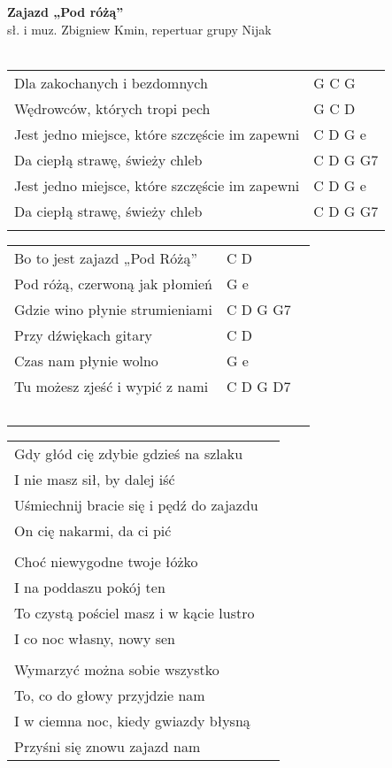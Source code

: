\documentclass[a5paper]{article}
\begin{document}


\noindent
\fontsize{12pt}{15pt}\selectfont
\textbf{Zajazd „Pod różą”} \\
\fontsize{8pt}{10pt}\selectfont
sł. i muz. Zbigniew Kmin, repertuar grupy Nijak \\ \\
\fontsize{10pt}{12pt}\selectfont
{}
\begin{tabular}{@{}p{8.50cm}p{3cm}@{}}
\noindent
Dla zakochanych i bezdomnych & G C G \\
Wędrowców, których tropi pech & G C D \\
Jest jedno miejsce, które szczęście im zapewni & C D G e \\
Da ciepłą strawę, świeży chleb & C D G G7 \\
Jest jedno miejsce, które szczęście im zapewni & C D G e \\
Da ciepłą strawę, świeży chleb & C D G G7 \\ \\
\end{tabular}

\noindent
\begin{tabular}{@{}p{7.50cm}p{3cm}@{}}
Bo to jest zajazd „Pod Różą” & C D \\
Pod różą, czerwoną jak płomień & G e \\
Gdzie wino płynie strumieniami & C D G G7 \\
Przy dźwiękach gitary & C D \\
Czas nam płynie wolno & G e \\
Tu możesz zjeść i wypić z nami & C D G D7 \ \\\
\end{tabular}

\noindent
\begin{tabular}{@{}p{7.50cm}p{3cm}@{}}
Gdy głód cię zdybie gdzieś na szlaku \\
I nie masz sił, by dalej iść \\
Uśmiechnij bracie się i pędź do zajazdu \\
On cię nakarmi, da ci pić \\ \\
 
Choć niewygodne twoje łóżko \\
I na poddaszu pokój ten \\
To czystą pościel masz i w kącie lustro \\
I co noc własny, nowy sen \\ \\
 
Wymarzyć można sobie wszystko \\
To, co do głowy przyjdzie nam \\
I w ciemna noc, kiedy gwiazdy błysną \\
Przyśni się znowu zajazd nam
\end{tabular}
\end{document}
